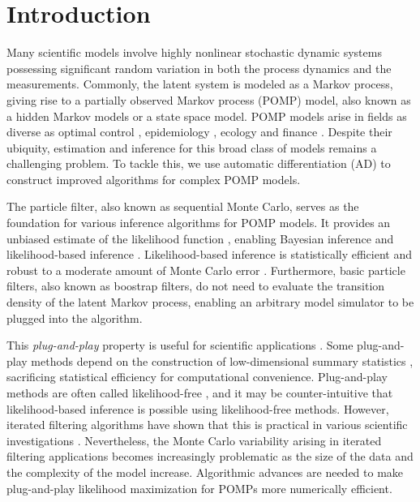 \documentclass[numsec,webpdf,modern,medium,namedate]{oup-authoring-template}
\theoremstyle{thmstyleone}%
\theoremstyle{thmstyletwo}%
\theoremstyle{thmstylethree}%
\begin{document}
\maketitle

\section{Introduction}

Many scientific models involve highly nonlinear stochastic dynamic systems possessing significant random variation in both the process dynamics and the measurements.
Commonly, the latent system is modeled as a Markov process, giving rise to a partially observed Markov process (POMP) model, also known as a hidden Markov models or a state space model.
POMP models arise in fields as diverse as optimal control \citep{singh22}, epidemiology \citep{he10, stocks17}, ecology \citep{knape12} and finance \citep{kim08, breto14}.
Despite their ubiquity, estimation and inference for this broad class of models remains a challenging problem.
To tackle this, we use automatic differentiation (AD) to construct improved algorithms for complex POMP models.

The particle filter, also known as sequential Monte Carlo, serves as the foundation for various inference algorithms for POMP models.
It provides an unbiased estimate of the likelihood function  \citep{delMoral04}, enabling Bayesian inference \citep{andrieu10,chopin13} and likelihood-based inference \citep{ionides06-pnas,ionides15}.
Likelihood-based inference is statistically efficient \citep{pawitan01} and robust to a moderate amount of Monte Carlo error \citep{ionides17,ning21}.
Furthermore, basic particle filters, also known as boostrap filters, do not need to evaluate the transition density of the latent Markov process, enabling an arbitrary model simulator to be plugged into the algorithm.

This \textit{plug-and-play} property is useful for scientific applications \citep{he10}.
Some plug-and-play methods depend on the construction of low-dimensional summary statistics \citep{wood10,toni09}, sacrificing statistical efficiency for computational convenience.
Plug-and-play methods are often called likelihood-free \citep{owen15}, and it may be counter-intuitive that likelihood-based inference is possible using likelihood-free methods. 
However, iterated filtering algorithms have shown that this is practical in various scientific investigations \citep{king08,blake14,pons-salort18,subramanian21,fox22,drake23}.
Nevertheless, the Monte Carlo variability arising in iterated filtering applications becomes increasingly problematic as the size of the data and the complexity of the model increase.
Algorithmic advances are needed to make plug-and-play likelihood maximization for POMPs more numerically efficient.
\end{document}
